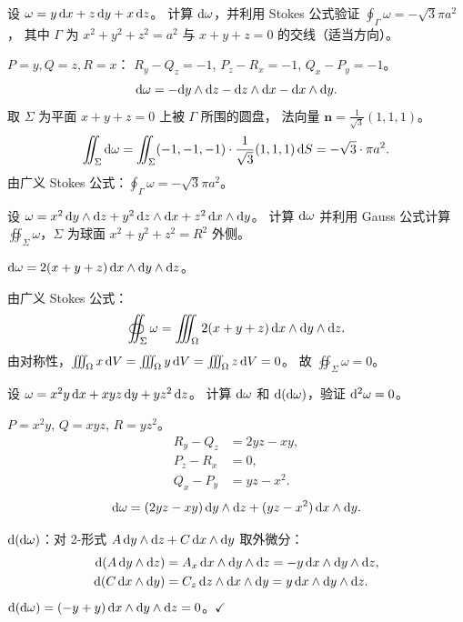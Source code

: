 \documentclass{article}
\begin{document}
\begin{exercise}
  设 $\omega = y\,\mathrm{d} x + z\,\mathrm{d} y + x\,\mathrm{d} z$。
  计算 $\mathrm{d}\omega$，并利用 Stokes 公式验证
  $\oint_\Gamma \omega = -\sqrt{3}\pi a^2$，
  其中 $\Gamma$ 为 $x^2+y^2+z^2=a^2$ 与 $x+y+z=0$ 的交线（适当方向）。
\end{exercise}

\begin{solution}
  $P=y, Q=z, R=x$：
  $R_y-Q_z = -1$, $P_z-R_x = -1$, $Q_x-P_y = -1$。
  \[
    \mathrm{d}\omega = -\mathrm{d} y\wedge\mathrm{d} z - \mathrm{d} z\wedge\mathrm{d} x - \mathrm{d} x\wedge\mathrm{d} y.
  \]
  取 $\Sigma$ 为平面 $x+y+z=0$ 上被 $\Gamma$ 所围的圆盘，
  法向量 $\mathbf{n} = \frac{1}{\sqrt{3}}(1,1,1)$。
  \[
    \iint_\Sigma \mathrm{d}\omega
    = \iint_\Sigma (-1,-1,-1)\cdot\frac{1}{\sqrt{3}}(1,1,1)\,\mathrm{d} S
    = -\sqrt{3}\cdot\pi a^2.
  \]
  由广义 Stokes 公式：$\oint_\Gamma \omega = -\sqrt{3}\pi a^2$。
\end{solution}

\begin{exercise}
  设 $\omega = x^2\,\mathrm{d} y\wedge\mathrm{d} z + y^2\,\mathrm{d} z\wedge\mathrm{d} x +
  z^2\,\mathrm{d} x\wedge\mathrm{d} y$。
  计算 $\mathrm{d}\omega$ 并利用 Gauss 公式计算
  $\oiint_\Sigma \omega$，$\Sigma$ 为球面 $x^2+y^2+z^2=R^2$ 外侧。
\end{exercise}

\begin{solution}
  $\mathrm{d}\omega = 2(x+y+z)\,\mathrm{d} x\wedge\mathrm{d} y\wedge\mathrm{d} z$。

  由广义 Stokes 公式：
  \[
    \oiint_\Sigma \omega = \iiint_\Omega 2(x+y+z)\,\mathrm{d} x\wedge\mathrm{d}
    y\wedge\mathrm{d} z.
  \]
  由对称性，$\iiint_\Omega x\,\mathrm{d} V = \iiint_\Omega y\,\mathrm{d} V =
  \iiint_\Omega z\,\mathrm{d} V = 0$。
  故 $\oiint_\Sigma \omega = 0$。
\end{solution}

\begin{exercise}[$\dif^2 = 0$ 的具体验证]
  设 $\omega = x^2 y\,\mathrm{d} x + xyz\,\mathrm{d} y + yz^2\,\mathrm{d} z$。
  计算 $\mathrm{d}\omega$ 和 $\mathrm{d}(\mathrm{d}\omega)$，验证 $\mathrm{d}^2\omega = 0$。
\end{exercise}

\begin{solution}
  $P = x^2y$, $Q = xyz$, $R = yz^2$。
  \begin{align*}
    R_y - Q_z &= 2yz - xy, \\
    P_z - R_x &= 0, \\
    Q_x - P_y &= yz - x^2.
  \end{align*}
  \[
    \mathrm{d}\omega = (2yz-xy)\,\mathrm{d} y\wedge\mathrm{d} z + (yz-x^2)\,\mathrm{d} x\wedge\mathrm{d} y.
  \]

  $\mathrm{d}(\mathrm{d}\omega)$：对 2-形式 $A\,\mathrm{d} y\wedge\mathrm{d} z + C\,\mathrm{d}
  x\wedge\mathrm{d} y$ 取外微分：
  \begin{align*}
    \mathrm{d}(A\,\mathrm{d} y\wedge\mathrm{d} z) &= A_x\,\mathrm{d} x\wedge\mathrm{d} y\wedge\mathrm{d}
    z = -y\,\mathrm{d} x\wedge\mathrm{d} y\wedge\mathrm{d} z, \\
    \mathrm{d}(C\,\mathrm{d} x\wedge\mathrm{d} y) &= C_z\,\mathrm{d} z\wedge\mathrm{d} x\wedge\mathrm{d}
    y = y\,\mathrm{d} x\wedge\mathrm{d} y\wedge\mathrm{d} z.
  \end{align*}
  $\mathrm{d}(\mathrm{d}\omega) = (-y + y)\,\mathrm{d} x\wedge\mathrm{d} y\wedge\mathrm{d} z = 0$。$\checkmark$
\end{solution}
\end{document}

